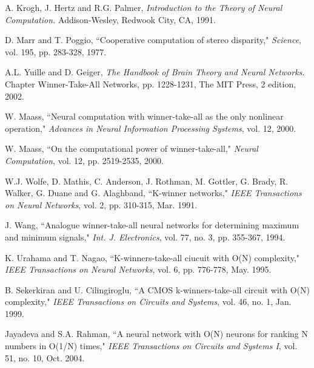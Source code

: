 \documentclass[conference]{IEEEtran}
\begin{document}
\def\V{\rm vol.~}
\def\N{no.~}
\def\pp{pp.~}
\def\Pot{\it Proc. }
\def\IJCNN{\it International Joint Conference on Neural Networks\rm }
\def\ACC{\it American Control Conference\rm }
\def\SMC{\it IEEE Trans. Systems\rm , \it Man\rm , and \it Cybernetics\rm }

\def\handb{ \it Handbook of Intelligent Control: Neural\rm , \it
    Fuzzy\rm , \it and Adaptive Approaches \rm }

\begin{thebibliography}{22}
 A. Krogh, J. Hertz and R.G. Palmer,
        {\it Introduction to the Theory of Neural Computation.}
        Addison-Wesley, Redwook City, CA, 1991.

 D. Marr and T. Poggio, ``Cooperative computation of stereo disparity,"
        {\it Science}, vol. 195, pp. 283-328, 1977.

 A.L. Yuille and D. Geiger,
        {\it The Handbook of Brain Theory and Neural Networks.}
        Chapter Winner-Take-All Networks, pp. 1228-1231, The MIT Press, 2 edition, 2002.

 W. Maass, ``Neural computation with winner-take-all as the only nonlinear
operation,"
        {\it Advances in Neural Information Processing Systems}, vol. 12, 2000.

 W. Maass, ``On the computational power of
winner-take-all,"
        {\it Neural Computation}, vol. 12, pp. 2519-2535, 2000.

 W.J. Wolfe, D. Mathis, C. Anderson, J. Rothman, M. Gottler, G. Brady, R. Walker, G. Duane and G. Alaghband, ``K-winner networks,"
        {\it IEEE Transactions on Neural Networks}, vol. 2, pp. 310-315, Mar. 1991.

 J. Wang, ``Analogue winner-take-all neural networks for determining maximum and minimum signals,"
        {\it Int. J. Electronics}, vol. 77, no. 3, pp. 355-367, 1994.

 K. Urahama and T. Nagao, ``K-winners-take-all ciucuit with O(N) complexity,"
        {\it IEEE Transactions on Neural Networks}, vol. 6, pp. 776-778, May. 1995.

 B. Sekerkiran and U. Cilingiroglu, ``A CMOS k-winners-take-all circuit with O(N) complexity,"
        {\it IEEE Transactions on Circuits and Systems}, vol. 46, no. 1, Jan. 1999.

 Jayadeva and S.A. Rahman, ``A neural network with O(N) neurons for ranking N numbers in O(1/N) times,"
        {\it IEEE Transactions on Circuits and Systems I}, vol. 51, no. 10, Oct. 2004.


\end{thebibliography}
\end{document}
